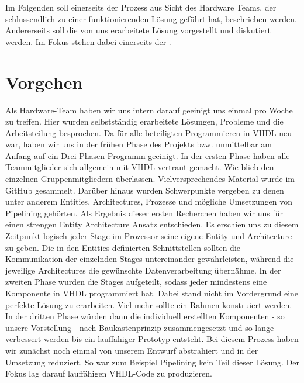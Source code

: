 \documentclass[paper=a4,fontsize=12pt,twocolumn]{scrreprt}
\begin{document}
Im Folgenden soll einerseits der Prozess aus Sicht des Hardware Teams, der schlussendlich zu einer funktionierenden Lösung geführt hat, beschrieben werden.
Andererseits soll die von uns erarbeitete Lösung vorgestellt und diskutiert werden.
Im Fokus stehen dabei einerseits der .

\section{Vorgehen}

Als Hardware-Team haben wir uns intern darauf geeinigt uns einmal pro Woche zu treffen.
Hier wurden selbstständig erarbeitete Lösungen, Probleme und die Arbeitsteilung besprochen.
Da für alle beteiligten Programmieren in VHDL neu war, haben wir uns in der frühen Phase des Projekts bzw. unmittelbar am Anfang auf ein Drei-Phasen-Programm geeinigt.
In der ersten Phase haben alle Teammitglieder sich allgemein mit VHDL vertraut gemacht.
Wie blieb den einzelnen Gruppenmitgliedern überlassen.
Vielversprechendes Material wurde im GitHub gesammelt.
Darüber hinaus wurden Schwerpunkte vergeben zu denen unter anderem Entities, Architectures, Prozesse und mögliche Umsetzungen von Pipelining gehörten.
Als Ergebnis dieser ersten Recherchen haben wir uns für einen strengen Entity Architecture Ansatz entschieden.
Es erschien uns zu diesem Zeitpunkt logisch jeder Stage im Prozessor seine eigene Entity und Architecture zu geben.
Die in den Entities definierten Schnittstellen sollten die Kommunikation der einzelnden Stages untereinander gewährleisten, während die jeweilige Architectures die gewünschte Datenverarbeitung übernähme.
In der zweiten Phase wurden die Stages aufgeteilt, sodass jeder mindestens eine Komponente in VHDL programmiert hat.
Dabei stand nicht im Vordergrund eine perfekte Lösung zu erarbeiten.
Viel mehr sollte ein Rahmen konstruiert werden.
In der dritten Phase würden dann die individuell erstellten Komponenten - so unsere Vorstellung - nach Baukastenprinzip zusammengesetzt und so lange verbessert werden bis ein lauffähiger Prototyp entsteht.
Bei diesem Prozess haben wir zunächst noch einmal von unserem Entwurf abstrahiert und in der Umsetzung reduziert.
So war zum Beispiel Pipelining kein Teil dieser Lösung.
Der Fokus lag darauf lauffähigen VHDL-Code zu produzieren.
\end{document}
